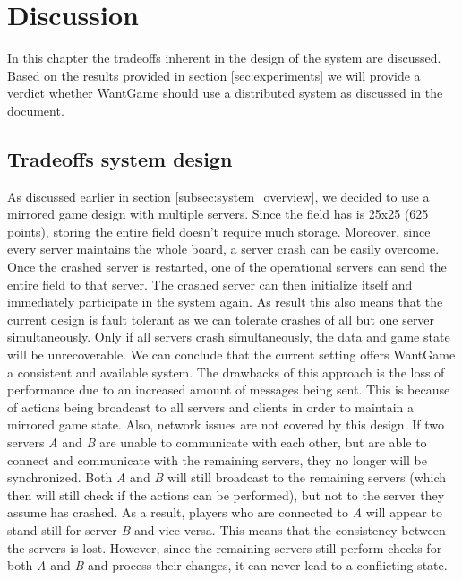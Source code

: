 \section{Discussion}


	In this chapter the tradeoffs inherent in the design of the system are discussed. Based on the results provided in section \ref{sec:experiments} we will provide a verdict whether WantGame should use a distributed system as discussed in the document.
	
	
	\subsection{Tradeoffs system design}
	\label{subsec:tradeoffs_system_design}
		As discussed earlier in section \ref{subsec:system_overview}, we decided to use a mirrored game design with multiple servers. 
		Since the field has is 25x25 (625 points), storing the entire field doesn't require much storage. 
		Moreover, since every server maintains the whole board, a server crash can be easily overcome.
		Once the crashed server is restarted, one of the operational servers can send the entire field to that server. 
		The crashed server can then initialize itself and immediately participate in the system again. 
		As result this also means that the current design is fault tolerant as we can tolerate crashes of all but one server simultaneously. 
		Only if all servers crash simultaneously, the data and game state will be unrecoverable.
		We can conclude that the current setting offers WantGame a consistent and available system. 
		The drawbacks of this approach is the loss of performance due to an increased amount of messages being sent. 
		This is because of actions being broadcast to all servers and clients in order to maintain a mirrored game state. 
		Also, network issues are not covered by this design. 
		If two servers \emph{A} and \emph{B} are unable to communicate with each other, but are able to connect and communicate with the remaining servers, they no longer will be synchronized. 
		Both \emph{A} and \emph{B} will still broadcast to the remaining servers (which then will still check if the actions can be performed), but not to the server they assume has crashed. 
		As a result, players who are connected to \emph{A} will appear to stand still for server \emph{B} and vice versa. This means that the consistency between the servers is lost. However, since the remaining servers still perform checks for both \emph{A} and \emph{B} and process their changes, it can never lead to a conflicting state.
	
